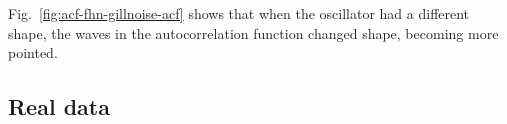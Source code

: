 Fig.\ \ref{fig:acf-fhn-gillnoise-acf} shows that when the oscillator had a different shape, the waves in the autocorrelation function changed shape, becoming more pointed.


\subsection{Real data}
\label{subsubsec:analysis-characterisation-real}

